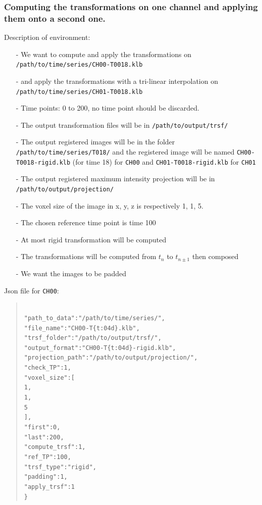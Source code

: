 \documentclass[10pt,a4paper]{article}
\newcommand\tab[1][.6cm]{\hspace*{#1}}
\newenvironment{code}[1]{\mbox{}\\[1ex]\hspace*{-#1cm}\begin{minipage}{150mm}\begin{quote}\tt}{\end{quote}\end{minipage}\mbox{}\\[1ex]}
\begin{document}
\subsubsection{Computing the transformations on one channel and applying them onto a second one.}
Description of environment:
\begin{itemize}
\item[-] We want to compute and apply the transformations on \texttt{/path/to/time/series/CH00-T0018.klb}
\item[-] and apply the transformations with a tri-linear interpolation on \texttt{/path/to/time/series/CH01-T0018.klb}
\item[-] Time points: 0 to 200, no time point should be discarded.
\item[-] The output transformation files will be in \texttt{/path/to/output/trsf/}
\item[-] The output registered images will be in the folder \texttt{/path/to/time/series/T018/} and the registered image will be named \texttt{CH00-T0018-rigid.klb} (for time 18) for \texttt{CH00} and \texttt{CH01-T0018-rigid.klb} for \texttt{CH01}
\item[-] The output registered maximum intensity projection will be in \texttt{/path/to/output/projection/}
\item[-] The voxel size of the image in x, y, z is respectively 1, 1, 5.
\item[-] The chosen reference time point is time 100
\item[-] At most rigid transformation will be computed
\item[-] The transformations will be computed from $t_n$ to $t_{n\pm 1}$ then composed
\item[-] We want the images to be padded
\end{itemize}
Json file for \texttt{CH00}:
\begin{code}{0.8}
\{\\
\tab"path\_to\_data":"/path/to/time/series/",\\
\tab"file\_name":"CH00-T\{t:04d\}.klb",\\
\tab"trsf\_folder":"/path/to/output/trsf/",\\
\tab"output\_format":"CH00-T\{t:04d\}-rigid.klb",\\
\tab"projection\_path":"/path/to/output/projection/",\\
\tab"check\_TP":1,\\
\tab"voxel\_size":[\\
\tab\tab1,\\
\tab\tab1,\\
\tab\tab5\\
\tab],\\
\tab"first":0,\\
\tab"last":200,\\
\tab"compute\_trsf":1,\\
\tab"ref\_TP":100,\\
\tab"trsf\_type":"rigid",\\
\tab"padding":1,\\
\tab"apply\_trsf":1\\
\}
\end{code}
\end{document}
